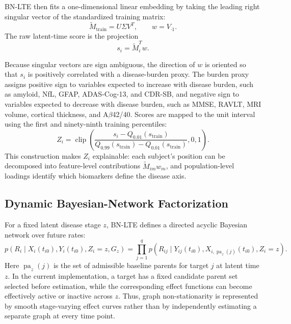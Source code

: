 BN-LTE then fits a one-dimensional linear embedding by taking the leading right
singular vector of the standardized training matrix:
\begin{equation}
\widetilde{M}_{\mathrm{train}}
=
U \Sigma V^T,
\qquad
w = V_{\cdot 1}.
\end{equation}
The raw latent-time score is the projection
\begin{equation}
s_i
=
\widetilde{M}_i^T w .
\end{equation}

Because singular vectors are sign ambiguous, the direction of $w$ is oriented
so that $s_i$ is positively correlated with a disease-burden proxy. The burden
proxy assigns positive sign to variables expected to increase with disease
burden, such as amyloid, NfL, GFAP, ADAS-Cog-13, and CDR-SB, and negative sign
to variables expected to decrease with disease burden, such as MMSE, RAVLT,
MRI volume, cortical thickness, and A$\beta$42/40. Scores are mapped to the
unit interval using the first and ninety-ninth training percentiles:
\begin{equation}
Z_i
=
\operatorname{clip}
\left(
\frac{s_i - Q_{0.01}(s_{\mathrm{train}})}
     {Q_{0.99}(s_{\mathrm{train}})-Q_{0.01}(s_{\mathrm{train}})},
0, 1
\right).
\label{eq:bnlte_z}
\end{equation}
This construction makes $Z_i$ explainable: each subject's position can be
decomposed into feature-level contributions $\widetilde{M}_{im}w_m$, and
population-level loadings identify which biomarkers define the disease axis.

\subsection{Dynamic Bayesian-Network Factorization}

For a fixed latent disease stage $z$, BN-LTE defines a directed acyclic
Bayesian network over future rates:
\begin{equation}
p(R_i \mid X_i(t_{i0}), Y_i(t_{i0}), Z_i=z, G_z)
=
\prod_{j=1}^{q}
p
\left(
R_{ij}
\mid
Y_{ij}(t_{i0}),
X_{i,\operatorname{pa}_z(j)}(t_{i0}),
Z_i=z
\right).
\label{eq:bnlte_factorization}
\end{equation}
Here $\operatorname{pa}_z(j)$ is the set of admissible baseline parents for
target $j$ at latent time $z$. In the current implementation, a target has a
fixed candidate parent set selected before estimation, while the corresponding
effect functions can become effectively active or inactive across $z$. Thus,
graph non-stationarity is represented by smooth stage-varying effect curves
rather than by independently estimating a separate graph at every time point.

